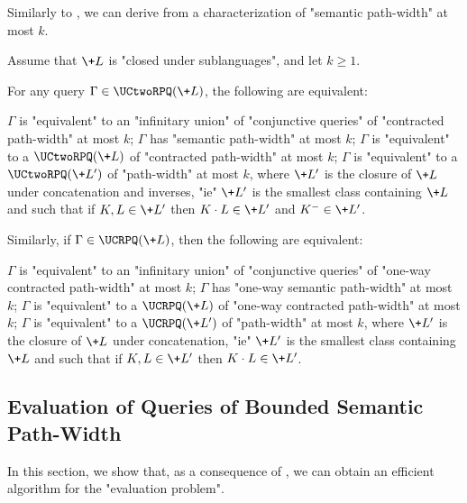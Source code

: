 Similarly to , we can derive from
 a characterization of "semantic path-width" at most $k$.
\begin{corollary}
	\AP\label{coro:charact-semantic-pathwidth-k}
	\AP Assume that $\+L$ is "closed under sublanguages", and let $k \geq 1$. 

	\noindent
    For any query $\Gamma \in \UCtwoRPQ(\+L)$, the following are equivalent:
    \begin{enumerate}
        \itemAP $\Gamma$ is "equivalent" to an "infinitary union" of "conjunctive queries"
            of "contracted path-width" at most $k$;
        \itemAP $\Gamma$ has "semantic path-width" at most $k$;
        \itemAP $\Gamma$ is "equivalent" to a $\UCtwoRPQ(\+L)$ of "contracted path-width" at most $k$;
        \itemAP $\Gamma$ is "equivalent" to a $\UCtwoRPQ(\+L')$ of "path-width" at most $k$,
			where $\+L'$ is the closure of $\+L$ under concatenation and inverses, "ie"
			$\+L'$ is the smallest class containing $\+L$ and such that  if $K, L \in \+L'$
			then $K\cdot L \in \+L'$ and $K^{-} \in \+L'$.
    \end{enumerate}

	\noindent
	Similarly, if $\Gamma \in \UCRPQ(\+L)$, then the following are equivalent:
	\begin{enumerate}
        \itemAP $\Gamma$ is "equivalent" to an "infinitary union" of "conjunctive queries"
            of "one-way contracted path-width" at most $k$;
        \itemAP $\Gamma$ has "one-way semantic path-width" at most $k$;
        \itemAP $\Gamma$ is "equivalent" to a $\UCRPQ(\+L)$ of "one-way contracted path-width" at most $k$;
        \itemAP $\Gamma$ is "equivalent" to a $\UCRPQ(\+L')$ of "path-width" at most $k$,
			where $\+L'$ is the closure of $\+L$ under concatenation, "ie"
			$\+L'$ is the smallest class containing $\+L$ and such that if $K, L \in \+L'$
			then $K\cdot L \in \+L'$.
    \end{enumerate}
\end{corollary}

\subsection{Evaluation of Queries of Bounded Semantic Path-Width}

In this section, we show that, as a consequence of , we can obtain an
efficient algorithm for the "evaluation problem".
\paraNLEvalBoundedSemPathWidth

